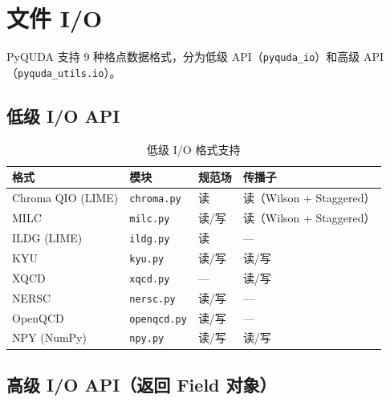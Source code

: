 \documentclass[12pt,a4paper]{ctexart}
\begin{document}
\section{文件 I/O}

PyQUDA 支持 9 种格点数据格式，分为低级 API（\texttt{pyquda\_io}）和高级 API（\texttt{pyquda\_utils.io}）。

\subsection{低级 I/O API}

\begin{table}[h]
\centering
\begin{tabular}{@{}llll@{}}
\toprule
\textbf{格式} & \textbf{模块} & \textbf{规范场} & \textbf{传播子} \\
\midrule
Chroma QIO (LIME) & \texttt{chroma.py} & 读 & 读（Wilson + Staggered）\\
MILC              & \texttt{milc.py}   & 读/写 & 读（Wilson + Staggered）\\
ILDG (LIME)       & \texttt{ildg.py}   & 读 & — \\
KYU               & \texttt{kyu.py}    & 读/写 & 读/写 \\
XQCD              & \texttt{xqcd.py}   & — & 读/写 \\
NERSC             & \texttt{nersc.py}  & 读/写 & — \\
OpenQCD           & \texttt{openqcd.py}& 读/写 & — \\
NPY (NumPy)       & \texttt{npy.py}    & 读/写 & 读/写 \\
\bottomrule
\end{tabular}
\caption{低级 I/O 格式支持}
\end{table}

\subsection{高级 I/O API（返回 Field 对象）}
\end{document}
